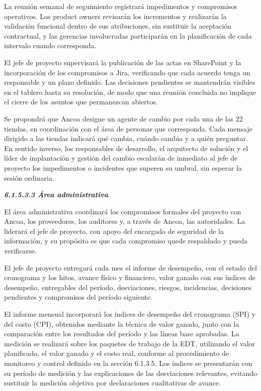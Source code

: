 \documentclass[11pt]{article}
\begin{document}
La reunión semanal de seguimiento registrará impedimentos y compromisos
operativos. Los product owners revisarán los incrementos y realizarán la
validación funcional dentro de sus atribuciones, sin sustituir la
aceptación contractual, y las gerencias involucradas participarán en la
planificación de cada intervalo cuando corresponda.

El jefe de proyecto supervisará la publicación de las actas en
SharePoint y la incorporación de los compromisos a Jira, verificando que
cada acuerdo tenga un responsable y un plazo definido. Las decisiones
pendientes se mantendrán visibles en el tablero hasta su resolución, de
modo que una reunión concluida no implique el cierre de los asuntos que
permanezcan abiertos.

Se propondrá que Ancoa designe un agente de cambio por cada una de las
22 tiendas, en coordinación con el área de personas que corresponda.
Cada mensaje dirigido a las tiendas indicará qué cambia, cuándo cambia y
a quién preguntar. En sentido inverso, los responsables de desarrollo,
el arquitecto de solución y el líder de implantación y gestión del
cambio escalarán de inmediato al jefe de proyecto los impedimentos o
incidentes que superen su umbral, sin esperar la sesión ordinaria.

\emph{\textbf{6.1.5.3.3 Área administrativa}}

El área administrativa coordinará los compromisos formales del proyecto
con Ancoa, los proveedores, los auditores y, a través de Ancoa, las
autoridades. La liderará el jefe de proyecto, con apoyo del encargado de
seguridad de la información, y su propósito es que cada compromiso quede
respaldado y pueda verificarse.

El jefe de proyecto entregará cada mes el informe de desempeño, con el
estado del cronograma y los hitos, avance físico y financiero, valor
ganado con sus índices de desempeño, entregables del período,
desviaciones, riesgos, incidencias, decisiones pendientes y compromisos
del período siguiente.

El informe mensual incorporará los índices de desempeño del cronograma
(SPI) y del costo (CPI), obtenidos mediante la técnica de valor ganado,
junto con la comparación entre los resultados del período y las líneas
base aprobadas. La medición se realizará sobre los paquetes de trabajo
de la EDT, utilizando el valor planificado, el valor ganado y el costo
real, conforme al procedimiento de monitoreo y control definido en la
sección 6.1.3.5. Los índices se presentarán con su período de medición y
las explicaciones de las desviaciones relevantes, evitando sustituir la
medición objetiva por declaraciones cualitativas de avance.
\end{document}

